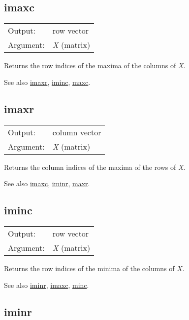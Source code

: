 \subsection{imaxc}
\hypertarget{func-imaxc}{}

\begin{tabular}{ll}
Output:     & row vector\\
Argument:   & \textsl{X} (matrix)\\
\end{tabular}

	  Returns the row indices of the maxima of the columns of
	  \textsl{X}. 

	  See also \hyperlink{func-imaxr}{imaxr}, \hyperlink{func-iminc}{iminc}, \hyperlink{func-maxc}{maxc}.

\subsection{imaxr}
\hypertarget{func-imaxr}{}

\begin{tabular}{ll}
Output:     & column vector\\
Argument:   & \textsl{X} (matrix)\\
\end{tabular}

	  Returns the column indices of the maxima of the rows of
	  \textsl{X}. 

	  See also \hyperlink{func-imaxc}{imaxc}, \hyperlink{func-iminr}{iminr}, \hyperlink{func-maxr}{maxr}.

\subsection{iminc}
\hypertarget{func-iminc}{}

\begin{tabular}{ll}
Output:     & row vector\\
Argument:   & \textsl{X} (matrix)\\
\end{tabular}

	  Returns the row indices of the minima of the columns of
	  \ensuremath{X}. 

	  See also \hyperlink{func-iminr}{iminr}, \hyperlink{func-imaxc}{imaxc}, \hyperlink{func-minc}{minc}.

\subsection{iminr}
\hypertarget{func-iminr}{}

